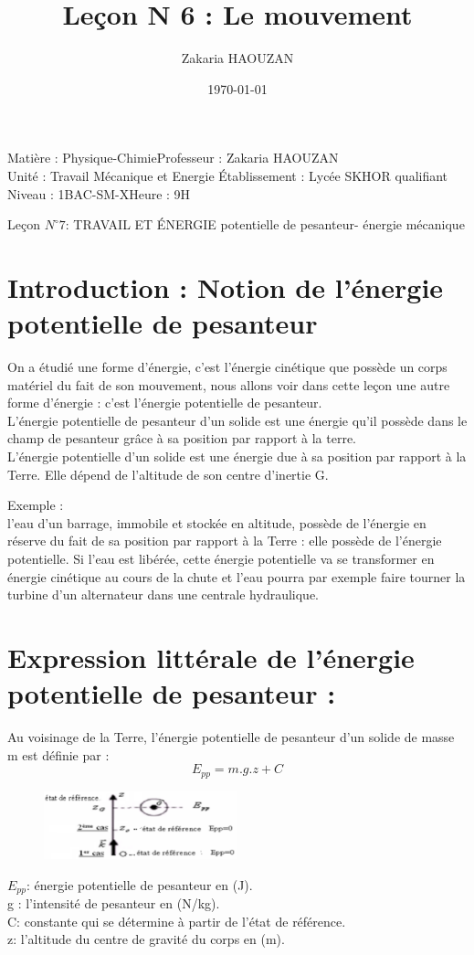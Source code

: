 \documentclass[12pt]{article}
\title{Leçon N 6 : Le mouvement}
\author{Zakaria HAOUZAN}
\date{\today}
\newcommand\headerMe[2]{\noindent{}#1\hfill#2}
\begin{document}
\headerMe{Matière : Physique-Chimie}{Professeur : Zakaria HAOUZAN}\\
\headerMe{Unité : Travail Mécanique et Energie }{Établissement : Lycée SKHOR qualifiant}\\
\headerMe{Niveau : 1BAC-SM-X}{Heure : 9H}\\

\begin{center}

    \Large{Leçon $N^{\circ} 7 $: \color{red} TRAVAIL ET ÉNERGIE potentielle de pesanteur- énergie mécanique}
\end{center}
\section{ Introduction : Notion de l’énergie potentielle de pesanteur}
On a étudié une forme d'énergie, c'est l'énergie cinétique que possède un corps matériel du fait de son mouvement, nous allons voir dans cette leçon une autre forme d'énergie : c'est l'énergie potentielle de pesanteur.
\\L'énergie potentielle de pesanteur d'un solide est une énergie qu'il possède dans le champ de pesanteur grâce à sa position par rapport à la terre.
\\L'énergie potentielle d'un solide est une énergie due à sa position par rapport à la Terre. Elle dépend de
l'altitude de son centre d'inertie G.

Exemple : 
\\l’eau d’un barrage, immobile et stockée en altitude, possède de l’énergie en réserve du fait de sa position par rapport à la
Terre : elle possède de l’énergie potentielle. Si l’eau est libérée, cette énergie potentielle va se transformer en énergie
cinétique au cours de la chute et l’eau pourra par exemple faire tourner la turbine d’un alternateur dans une centrale
hydraulique.



\section{Expression littérale de l’énergie potentielle de pesanteur :  }
Au voisinage de la Terre, l’énergie potentielle de pesanteur d’un solide de masse m est définie par :$$E_{pp} = m.g.z + C$$

\begin{figure}
    \includegraphics[width=0.5\textwidth]{./img/img00.png}
\end{figure}
$E_{pp}$: énergie potentielle de pesanteur en (J).
\\g : l'intensité de pesanteur en (N/kg).
\\C: constante qui se détermine à partir de l'état de référence.
\\z: l'altitude du centre de gravité du corps en (m).
\end{document}
